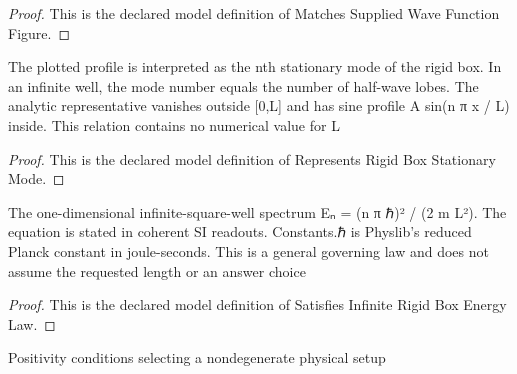 \begin{proof}
  This is the declared model definition of Matches Supplied Wave Function Figure.
\end{proof}
\begin{definition}
  \label{def:physics:phyx-mini-0508:phyxminiproblems-problemphyxmini0508-representsrigidboxstationarymode}
  The plotted profile is interpreted as the nth stationary mode of the rigid box. In an infinite well, the mode number equals the number of half-wave lobes. The analytic representative vanishes outside [0,L] and has sine profile A sin(n π x / L) inside. This relation contains no numerical value for L
\end{definition}
\begin{proof}
  This is the declared model definition of Represents Rigid Box Stationary Mode.
\end{proof}
\begin{definition}
  \label{def:physics:phyx-mini-0508:phyxminiproblems-problemphyxmini0508-satisfiesinfiniterigidboxenergylaw}
  The one-dimensional infinite-square-well spectrum Eₙ = (n π ℏ)² / (2 m L²). The equation is stated in coherent SI readouts. Constants.ℏ is Physlib's reduced Planck constant in joule-seconds. This is a general governing law and does not assume the requested length or an answer choice
\end{definition}
\begin{proof}
  This is the declared model definition of Satisfies Infinite Rigid Box Energy Law.
\end{proof}
\begin{definition}
  \label{def:physics:phyx-mini-0508:phyxminiproblems-problemphyxmini0508-hasphysicalrigidboxparameters}
  Positivity conditions selecting a nondegenerate physical setup
\end{definition}
